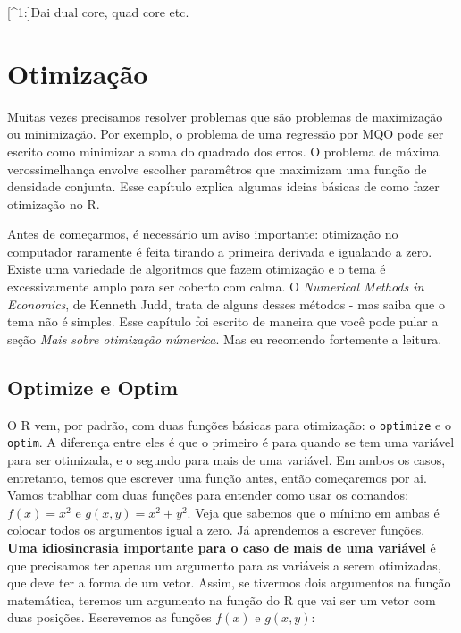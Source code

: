 \documentclass[
]{book}
\begin{document}
{[}\^{}1:{]}Dai dual core, quad core etc.

\hypertarget{otimizauxe7uxe3o}{%
\chapter{Otimização}\label{otimizauxe7uxe3o}}

Muitas vezes precisamos resolver problemas que são problemas de maximização ou minimização. Por exemplo, o problema de uma regressão por MQO pode ser escrito como minimizar a soma do quadrado dos erros. O problema de máxima verossimelhança envolve escolher paramêtros que maximizam uma função de densidade conjunta. Esse capítulo explica algumas ideias básicas de como fazer otimização no R.

Antes de começarmos, é necessário um aviso importante: otimização no computador raramente é feita tirando a primeira derivada e igualando a zero. Existe uma variedade de algoritmos que fazem otimização e o tema é excessivamente amplo para ser coberto com calma. O \emph{Numerical Methods in Economics}, de Kenneth Judd, trata de alguns desses métodos - mas saiba que o tema não é simples. Esse capítulo foi escrito de maneira que você pode pular a seção \emph{Mais sobre otimização númerica}. Mas eu recomendo fortemente a leitura.

\hypertarget{optimize-e-optim}{%
\section{Optimize e Optim}\label{optimize-e-optim}}

O R vem, por padrão, com duas funções básicas para otimização: o \texttt{optimize} e o \texttt{optim}. A diferença entre eles é que o primeiro é para quando se tem uma variável para ser otimizada, e o segundo para mais de uma variável. Em ambos os casos, entretanto, temos que escrever uma função antes, então começaremos por ai. Vamos trablhar com duas funções para entender como usar os comandos: \(f(x)=x^2\) e \(g(x,y)=x^2+y^2\). Veja que sabemos que o mínimo em ambas é colocar todos os argumentos igual a zero. Já aprendemos a escrever funções. \textbf{Uma idiosincrasia importante para o caso de mais de uma variável} é que precisamos ter apenas um argumento para as variáveis a serem otimizadas, que deve ter a forma de um vetor. Assim, se tivermos dois argumentos na função matemática, teremos um argumento na função do R que vai ser um vetor com duas posições. Escrevemos as funções \(f(x)\) e \(g(x,y)\):
\end{document}
